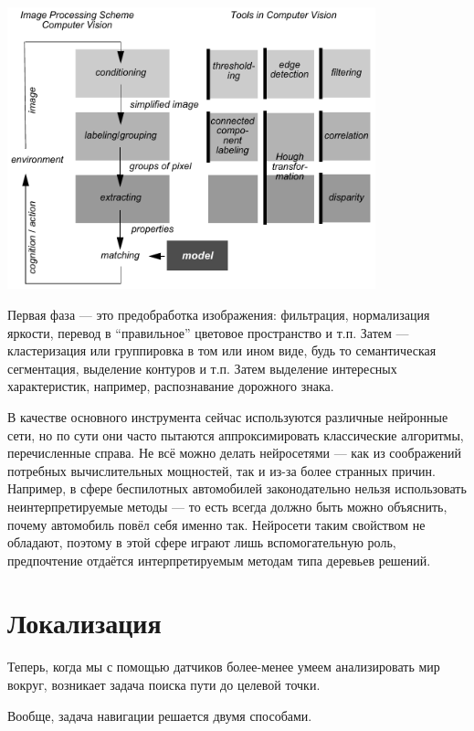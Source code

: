 \documentclass{../../text-style}
\begin{document}
\begin{center}
    \includegraphics[width=0.8\textwidth]{cvScheme.png}
\end{center}

Первая фаза --- это предобработка изображения: фильтрация, нормализация яркости, перевод в \enquote{правильное} цветовое пространство и т.п.
Затем --- кластеризация или группировка в том или ином виде, будь то семантическая сегментация, выделение контуров и т.п.
Затем выделение интересных характеристик, например, распознавание дорожного знака.

В качестве основного инструмента сейчас используются различные нейронные сети, но по сути они часто пытаются аппроксимировать классические алгоритмы, перечисленные справа.
Не всё можно делать нейросетями --- как из соображений потребных вычислительных мощностей, так и из-за более странных причин.
Например, в сфере беспилотных автомобилей законодательно нельзя использовать неинтерпретируемые методы --- то есть всегда должно быть можно объяснить, почему автомобиль повёл себя именно так.
Нейросети таким свойством не обладают, поэтому в этой сфере играют лишь вспомогательную роль, предпочтение отдаётся интерпретируемым методам типа деревьев решений.

\section{Локализация}

Теперь, когда мы с помощью датчиков более-менее умеем анализировать мир вокруг, возникает задача поиска пути до целевой точки.

Вообще, задача навигации решается двумя способами.
\end{document}

